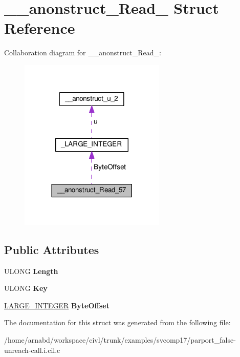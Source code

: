 \hypertarget{struct____anonstruct__Read__57}{}\section{\+\_\+\+\_\+anonstruct\+\_\+\+Read\+\_ Struct Reference}
\label{struct____anonstruct__Read__57}


Collaboration diagram for \+\_\+\+\_\+anonstruct\+\_\+\+Read\+\_\+:
\nopagebreak
\begin{figure}[H]
\begin{center}
\leavevmode
\includegraphics[width=197pt]{struct____anonstruct__Read__57__coll__graph}
\end{center}
\end{figure}
\subsection*{Public Attributes}
\begin{DoxyCompactItemize}
\item 
\hypertarget{struct____anonstruct__Read__57_a6ea0f8cb40ef3ecafe09fa033ff95bc8}{}U\+L\+O\+N\+G {\bfseries Length}\label{struct____anonstruct__Read__57_a6ea0f8cb40ef3ecafe09fa033ff95bc8}

\item 
\hypertarget{struct____anonstruct__Read__57_a855ca16adc76f1cb99255fe64e44fa68}{}U\+L\+O\+N\+G {\bfseries Key}\label{struct____anonstruct__Read__57_a855ca16adc76f1cb99255fe64e44fa68}

\item 
\hypertarget{struct____anonstruct__Read__57_ac4b45d637ddfc60754c1dda04406b495}{}\hyperlink{union__LARGE__INTEGER}{L\+A\+R\+G\+E\+\_\+\+I\+N\+T\+E\+G\+E\+R} {\bfseries Byte\+Offset}\label{struct____anonstruct__Read__57_ac4b45d637ddfc60754c1dda04406b495}

\end{DoxyCompactItemize}


The documentation for this struct was generated from the following file\+:\begin{DoxyCompactItemize}
\item 
/home/arnabd/workspace/civl/trunk/examples/svcomp17/parport\+\_\+false-\/unreach-\/call.\+i.\+cil.\+c\end{DoxyCompactItemize}
